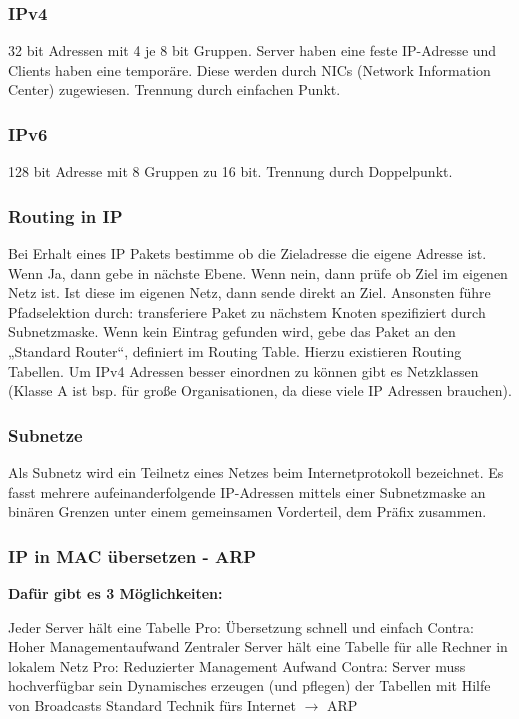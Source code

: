\documentclass[12pt,a4paper]{article}
\begin{document}
\subsubsection{IPv4}
32 bit Adressen mit 4 je 8 bit Gruppen. Server haben eine feste IP-Adresse und Clients haben eine temporäre. Diese werden durch NICs (Network Information Center) zugewiesen. Trennung durch einfachen Punkt.

\subsubsection{IPv6}
128 bit Adresse mit 8 Gruppen zu 16 bit. Trennung durch Doppelpunkt.

\subsubsection{Routing in IP}
Bei Erhalt eines IP Pakets bestimme ob die Zieladresse die eigene Adresse ist. Wenn Ja, dann gebe in nächste Ebene. Wenn nein, dann prüfe ob Ziel im eigenen Netz ist. Ist diese im eigenen Netz, dann sende direkt an Ziel. Ansonsten führe Pfadselektion durch: \newline
transferiere Paket zu nächstem Knoten spezifiziert durch Subnetzmaske. Wenn kein Eintrag gefunden wird, gebe das Paket an den „Standard Router“, definiert im Routing Table. Hierzu existieren Routing Tabellen. Um IPv4 Adressen besser einordnen zu können gibt es Netzklassen (Klasse A ist bsp. für große Organisationen, da diese viele IP Adressen brauchen).

\subsubsection{Subnetze}
Als Subnetz wird ein Teilnetz eines Netzes beim Internetprotokoll bezeichnet. Es fasst mehrere aufeinanderfolgende IP-Adressen mittels einer Subnetzmaske an binären Grenzen unter einem gemeinsamen Vorderteil, dem Präfix zusammen.

\subsubsection{IP in MAC übersetzen - ARP}
\textbf{Dafür gibt es 3 Möglichkeiten:}
\begin{outline}
	\1 Jeder Server hält eine Tabelle
		\2 Pro: Übersetzung schnell und einfach
		\2 Contra: Hoher Managementaufwand
	\1 Zentraler Server hält eine Tabelle für alle Rechner in lokalem Netz
		\2 Pro: Reduzierter Management Aufwand
		\2 Contra: Server muss hochverfügbar sein
	\1 Dynamisches erzeugen (und pflegen) der Tabellen mit Hilfe von Broadcasts
		\2 Standard Technik fürs Internet $\rightarrow$ ARP
\end{outline}
\end{document}
